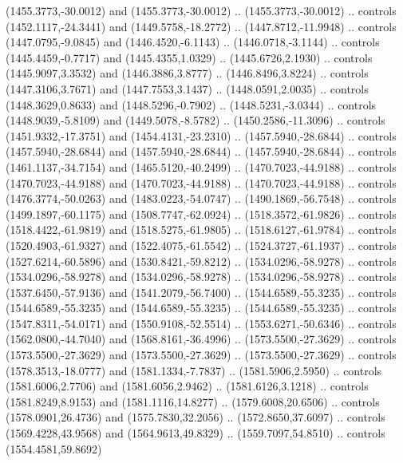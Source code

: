 \begin{scope}[shift={(19.44451,-318.97965)}]
\begin{scope}[shift={(-2093.8013,-1176.4989)}]
\begin{scope}
\begin{scope}
\begin{scope}[shift={(1261.8671,1726.9965)}]
            (1455.3773,-30.0012) and (1455.3773,-30.0012) .. (1455.3773,-30.0012) ..
            controls (1452.1117,-24.3441) and (1449.5758,-18.2772) .. (1447.8712,-11.9948)
            .. controls (1447.0795,-9.0845) and (1446.4520,-6.1143) .. (1446.0718,-3.1144)
            .. controls (1445.4459,-0.7717) and (1445.4355,1.0329) .. (1445.6726,2.1930)
            .. controls (1445.9097,3.3532) and (1446.3886,3.8777) .. (1446.8496,3.8224) ..
            controls (1447.3106,3.7671) and (1447.7553,3.1437) .. (1448.0591,2.0035) ..
            controls (1448.3629,0.8633) and (1448.5296,-0.7902) .. (1448.5231,-3.0344) ..
            controls (1448.9039,-5.8109) and (1449.5078,-8.5782) .. (1450.2586,-11.3096)
            .. controls (1451.9332,-17.3751) and (1454.4131,-23.2310) ..
            (1457.5940,-28.6844) .. controls (1457.5940,-28.6844) and (1457.5940,-28.6844)
            .. (1457.5940,-28.6844) .. controls (1461.1137,-34.7154) and
            (1465.5120,-40.2499) .. (1470.7023,-44.9188) .. controls (1470.7023,-44.9188)
            and (1470.7023,-44.9188) .. (1470.7023,-44.9188) .. controls
            (1476.3774,-50.0263) and (1483.0223,-54.0747) .. (1490.1869,-56.7548) ..
            controls (1499.1897,-60.1175) and (1508.7747,-62.0924) .. (1518.3572,-61.9826)
            .. controls (1518.4422,-61.9819) and (1518.5275,-61.9805) ..
            (1518.6127,-61.9784) .. controls (1520.4903,-61.9327) and (1522.4075,-61.5542)
            .. (1524.3727,-61.1937) .. controls (1527.6214,-60.5896) and
            (1530.8421,-59.8212) .. (1534.0296,-58.9278) .. controls (1534.0296,-58.9278)
            and (1534.0296,-58.9278) .. (1534.0296,-58.9278) .. controls
            (1537.6450,-57.9136) and (1541.2079,-56.7400) .. (1544.6589,-55.3235) ..
            controls (1544.6589,-55.3235) and (1544.6589,-55.3235) .. (1544.6589,-55.3235)
            .. controls (1547.8311,-54.0171) and (1550.9108,-52.5514) ..
            (1553.6271,-50.6346) .. controls (1562.0800,-44.7040) and (1568.8161,-36.4996)
            .. (1573.5500,-27.3629) .. controls (1573.5500,-27.3629) and
            (1573.5500,-27.3629) .. (1573.5500,-27.3629) .. controls (1578.3513,-18.0777)
            and (1581.1334,-7.7837) .. (1581.5906,2.5950) .. controls (1581.6006,2.7706)
            and (1581.6056,2.9462) .. (1581.6126,3.1218) .. controls (1581.8249,8.9153)
            and (1581.1116,14.8277) .. (1579.6008,20.6506) .. controls (1578.0901,26.4736)
            and (1575.7830,32.2056) .. (1572.8650,37.6097) .. controls (1569.4228,43.9568)
            and (1564.9613,49.8329) .. (1559.7097,54.8510) .. controls (1554.4581,59.8692)

\end{scope}
\end{scope}
\end{scope}
\end{scope}
\end{scope}
